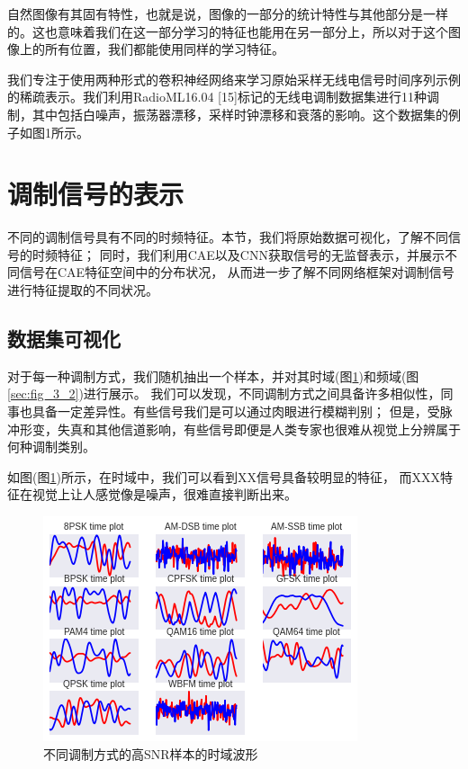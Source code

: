自然图像有其固有特性，也就是说，图像的一部分的统计特性与其他部分是一样的。这也意味着我们在这一部分学习的特征也能用在另一部分上，所以对于这个图像上的所有位置，我们都能使用同样的学习特征。\par

我们专注于使用两种形式的卷积神经网络来学习原始采样无线电信号时间序列示例的稀疏表示。我们利用RadioML16.04 [15]标记的无线电调制数据集进行11种调制，其中包括白噪声，振荡器漂移，采样时钟漂移和衰落的影响。这个数据集的例子如图1所示。\par


\section{调制信号的表示}

不同的调制信号具有不同的时频特征。本节，我们将原始数据可视化，了解不同信号的时频特征；
同时，我们利用CAE以及CNN获取信号的无监督表示，并展示不同信号在CAE特征空间中的分布状况，
从而进一步了解不同网络框架对调制信号进行特征提取的不同状况。

\subsection{数据集可视化}

对于每一种调制方式，我们随机抽出一个样本，并对其时域(图\ref{sec:fig_3_1})和频域(图\ref{sec:fig_3_2})进行展示。
我们可以发现，不同调制方式之间具备许多相似性，同事也具备一定差异性。有些信号我们是可以通过肉眼进行模糊判别；
但是，受脉冲形变，失真和其他信道影响，有些信号即便是人类专家也很难从视觉上分辨属于何种调制类别。\par

如图(图\ref{sec:fig_3_1})所示，在时域中，我们可以看到XX信号具备较明显的特征，
而XXX特征在视觉上让人感觉像是噪声，很难直接判断出来。\par
\begin{figure}[!h]
	\centering
	\includegraphics[scale=0.9]{figures/chapter_3/signal_view_1}
	\caption{不同调制方式的高SNR样本的时域波形}\label{sec:fig_3_1}
\end{figure}

